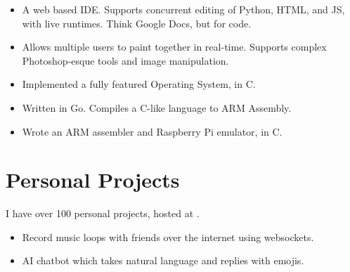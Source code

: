 \documentclass{jcgcv}
\begin{document}
\begin{column}
\begin{adjustwidth}{0.3cm}{}
\begin{itemize}
  \item A web based IDE. Supports concurrent editing of Python, HTML,
        and JS, with live runtimes. Think Google Docs, but for code.
\end{itemize}

\begin{itemize}
  \item Allows multiple users to paint together in real-time. Supports
        complex Photoshop-esque tools and image manipulation.
\end{itemize}

\begin{itemize}
  \item Implemented a fully featured Operating System, in C.
\end{itemize}

\begin{itemize}
  \item Written in Go. Compiles a C-like language to ARM Assembly.
\end{itemize}

\begin{itemize}
  \item Wrote an ARM assembler and Raspberry Pi emulator, in C.
\end{itemize}

\end{adjustwidth}



\section{Personal Projects}

I have over 100 personal projects, hosted at
.

\vspace{2pt}

\begin{itemize}
  \item Record music loops with friends over the internet using websockets.
\end{itemize}

\begin{itemize}
  \item AI chatbot which takes natural language and replies with emojis.
\end{itemize}


\end{column}
\end{document}
